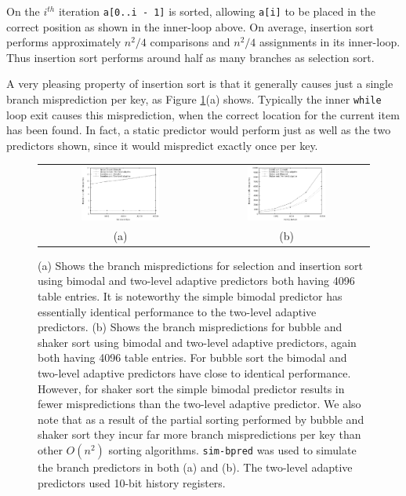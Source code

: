 \documentclass[acmtocl]{acmtrans2m}
\begin{document}
On the $i^{th}$ iteration \texttt{a[0..i - 1]} is sorted, allowing \texttt{a[i]}
to be placed in the correct position as shown in the inner-loop above. On
average, insertion sort performs approximately $n^2/4$ comparisons and $n^2/4$
assignments in its inner-loop. Thus insertion sort performs around half as many
branches as selection sort.

A very pleasing property of insertion sort is that it generally causes just a
single branch misprediction per key, as Figure \ref{elementary_sorts}(a) shows.
Typically the inner \texttt{while} loop exit causes this misprediction, when the
correct location for the current item has been found.  In fact, a static
predictor would perform just as well as the two predictors shown, since it would
mispredict exactly once per key.

\begin{figure}
\centering
\begin{tabular}{cc}
\includegraphics[width=0.5\textwidth]{plots/selection_insertion_sort_branches.eps} & \includegraphics[width=0.5\textwidth]{plots/bubble_shaker_sort_branches.eps} \\
(a) & (b) \\
\end{tabular}
\caption{(a) Shows the branch mispredictions for selection and insertion sort
using bimodal and two-level adaptive predictors both having 4096 table entries.
It is noteworthy the simple bimodal predictor has essentially identical
performance to the two-level adaptive predictors. (b) Shows the branch
mispredictions for bubble and shaker sort using bimodal and two-level adaptive
predictors, again both having 4096 table entries. For bubble sort the bimodal
and two-level adaptive predictors have close to identical performance. However,
for shaker sort the simple bimodal predictor results in fewer mispredictions
than the two-level adaptive predictor. We also note that as a result of the
partial sorting performed by bubble and shaker sort they incur far more branch
mispredictions per key than other $O(n^2)$ sorting algorithms.
\texttt{sim-bpred} was used to simulate the branch predictors in both (a) and
(b). The two-level adaptive predictors used 10-bit history registers.}
\label{elementary_sorts}
\end{figure}
\end{document}
